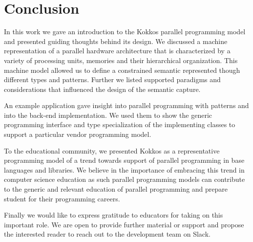 \section{Conclusion}\label{chap:conclusion}
In this work we gave an introduction to the Kokkos parallel programming model and presented guiding thoughts behind its design. We discussed a machine representation of a parallel hardware architecture that is characterized by a variety of processing units, memories and their hierarchical organization. This machine model allowed us to define a constrained semantic represented though different types and patterns. Further we listed supported paradigms and considerations that influenced the design of the semantic capture.

An example application gave insight into parallel programming with patterns and into the back-end implementation. We used them to show the generic programming interface and type specialization of the implementing classes to support a particular vendor programming model.

To the educational community, we presented Kokkos as a representative programming model of a trend towards support of parallel programming in base languages and libraries. We believe in the importance of embracing this trend in computer science education as such parallel programming models can contribute to the generic and relevant education of parallel programming and prepare student for their programming careers.

Finally we would like to express gratitude to educators for taking on this important role. We are open to provide further material or support and propose the interested reader to reach out to the development team on Slack\cite{KOKKOS_SLACK}.
